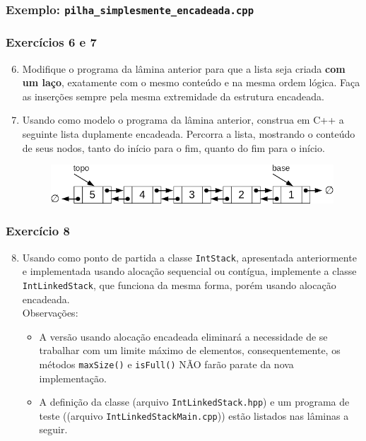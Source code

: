 \documentclass[aspectratio=169]{beamer}
\begin{document}
\begin{frame}[fragile]\frametitle{Exemplo: \texttt{pilha\_simplesmente\_encadeada.cpp}}
\fontsize{5pt}{5pt}\selectfont{

}
\end{frame}

\begin{frame}[fragile]\frametitle{Exercícios 6 e 7}
\begin{enumerate}
        \setcounter{enumi}{5}
	\item Modifique o programa da lâmina anterior para que a lista seja criada \textbf{com um laço}, exatamente com o mesmo conteúdo e na mesma ordem lógica. Faça as inserções sempre pela mesma extremidade da estrutura encadeada.
	\item Usando como modelo o programa da lâmina anterior, construa em C++ a seguinte lista duplamente encadeada. Percorra a lista, mostrando o conteúdo de seus nodos, tanto do início para o fim, quanto do fim para o início.	
\begin{figure}[h]
	\centering
	\includegraphics[height=0.16\paperheight]{imagens/pilha_duplamente_encadeada.png}
\end{figure}
\end{enumerate}
\end{frame}

\begin{frame}[fragile]\frametitle{Exercício 8}
\begin{enumerate}
        \setcounter{enumi}{7}
	\item Usando como ponto de partida a classe \texttt{IntStack}, apresentada anteriormente e implementada usando alocação sequencial ou contígua, implemente a classe \texttt{IntLinkedStack}, que funciona da mesma forma, porém usando alocação encadeada.\\
	Observações:
	\begin{itemize}
		\item A versão usando alocação encadeada eliminará a necessidade de se trabalhar com um limite máximo de elementos, consequentemente, os métodos \texttt{maxSize()} e \texttt{isFull()} NÃO farão parate da nova implementação.
		\item A definição da classe (arquivo \texttt{IntLinkedStack.hpp}) e um programa de teste ((arquivo \texttt{IntLinkedStackMain.cpp})) estão listados nas lâminas a seguir.
	\end{itemize}
\end{enumerate}
\end{frame}
\end{document}
